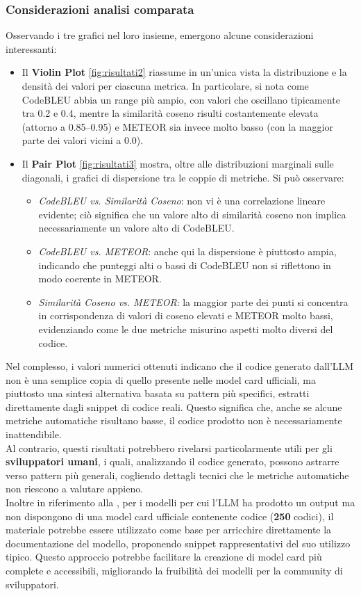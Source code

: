 \documentclass{article}
\begin{document}
\subsubsection{Considerazioni analisi comparata} 
Osservando i tre grafici nel loro insieme, emergono alcune considerazioni interessanti:
\begin{itemize} 
\item Il \textbf{Violin Plot} \ref{fig:risultati2} riassume in un’unica vista la distribuzione e la densità dei valori per ciascuna metrica. In particolare, si nota come CodeBLEU abbia un range più ampio, con valori che oscillano tipicamente tra 0.2 e 0.4, mentre la similarità coseno risulti costantemente elevata (attorno a 0.85--0.95) e METEOR sia invece molto basso (con la maggior parte dei valori vicini a 0.0). 
\item Il \textbf{Pair Plot} \ref{fig:risultati3} mostra, oltre alle distribuzioni marginali sulle diagonali, i grafici di dispersione tra le coppie di metriche. Si può osservare: 
\begin{itemize} \item \textit{CodeBLEU vs. Similarità Coseno}: non vi è una correlazione lineare evidente; ciò significa che un valore alto di similarità coseno non implica necessariamente un valore alto di CodeBLEU. 
\item \textit{CodeBLEU vs. METEOR}: anche qui la dispersione è piuttosto ampia, indicando che punteggi alti o bassi di CodeBLEU non si riflettono in modo coerente in METEOR. 
\item \textit{Similarità Coseno vs. METEOR}: la maggior parte dei punti si concentra in corrispondenza di valori di coseno elevati e METEOR molto bassi, evidenziando come le due metriche misurino aspetti molto diversi del codice. 
\end{itemize} 
\end{itemize}
Nel complesso, i valori numerici ottenuti indicano che il codice generato dall’LLM non è una semplice copia di quello presente nelle model card ufficiali, ma piuttosto una sintesi alternativa basata su pattern più specifici, estratti direttamente dagli snippet di codice reali. Questo significa che, anche se alcune metriche automatiche risultano basse, il codice prodotto non è necessariamente inattendibile. \\
Al contrario, questi risultati potrebbero rivelarsi particolarmente utili per gli \textbf{sviluppatori umani}, i quali, analizzando il codice generato, possono astrarre verso pattern più generali, cogliendo dettagli tecnici che le metriche automatiche non riescono a valutare appieno.\\
Inoltre in riferimento alla , per i modelli per cui l'LLM ha prodotto un output ma non dispongono di una model card ufficiale contenente codice (\textbf{250} codici), il materiale potrebbe essere utilizzato come base per arricchire direttamente la documentazione del modello, proponendo snippet rappresentativi del suo utilizzo tipico. Questo approccio potrebbe facilitare la creazione di model card più complete e accessibili, migliorando la fruibilità dei modelli per la community di sviluppatori.
\end{document}

